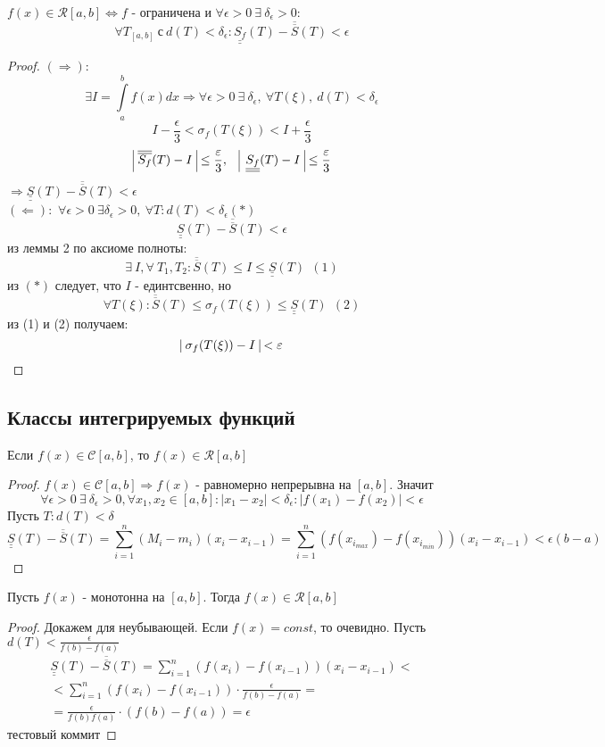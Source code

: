 \begin{theorem}
    $f(x)\in \mathcal{R}[a,b] \Leftrightarrow f$ - ограничена и $\forall \epsilon>0\ \exists\ \delta_{\epsilon}>0:$
    \[\forall T_{[a,b]}\ \text{с}\ d(T)<\delta_{\epsilon}: \underline{\underline{S_f}}(T)-\overline{\overline{S}}(T)<\epsilon\]
\end{theorem} 
\begin{proof}
    $(\Rightarrow):$
    \[\exists I=\int\limits_{a}^{b}f(x)dx \Rightarrow \forall \epsilon>0\ \exists\ \delta_{\epsilon},\ \forall T(\xi),\ d(T)<\delta_{\epsilon}\]
    \[I-\frac{\epsilon}{3}<\sigma_f(T(\xi))<I+\frac{\epsilon}{3}\]
    \[\vline\ \overline{\overline{S_f}}(T)-I\ \vline \leq \frac{\epsilon}{3},\ \ \  \vline\ \underline{\underline{S_f}}(T)-I\ \vline \leq \frac{\epsilon}{3}\]
    $\Rightarrow \underline{\underline{S}}(T)-\overline{\overline{S}}(T)<\epsilon$\\
    $(\Leftarrow):$
    $\forall \epsilon>0\ \exists \delta_{\epsilon}>0,\ \forall T: d(T)<\delta_{\epsilon} (*)$
    \[\underline{\underline{S}}(T)-\overline{\overline{S}}(T)<\epsilon\]
    из леммы 2 по аксиоме полноты: 
    \[\exists\ I, \forall\ T_1, T_2: \overline{\overline{S}}(T)\leq I\leq\underline{\underline{S}}(T)\ \ (1)\]
    из $(*)$ следует, что $I$ - единтсвенно, но 
    \[\forall T(\xi): \overline{\overline{S}}(T)\leq \sigma_f(T(\xi))\leq \underline{\underline{S}}(T)\ \ (2)\]
    из (1) и (2) получаем:
    \[\vline\ \sigma_f(T(\xi))-I \ \vline<\epsilon\]
\end{proof} 
\subsection{Классы интегрируемых функций}
\begin{theorem}
    Если $f(x)\in \mathcal{C}[a,b]$, то $f(x)\in \mathcal{R}[a,b]$
\end{theorem} 
\begin{proof}
    $f(x)\in \mathcal{C}[a,b] \Rightarrow f(x)$ - равномерно непрерывна на $[a,b]$. Значит 
    \[\forall \epsilon>0\ \exists\ \delta_{\epsilon}>0, \forall x_1, x_2\in [a,b]: |x_1-x_2|<\delta_{\epsilon}: |f(x_1)-f(x_2)|<\epsilon\]
    Пусть $T: d(T)<\delta$
    \[\underline{\underline{S}}(T)-\overline{\overline{S}}(T)=\sum\limits_{i=1}^{n}(M_i-m_i)(x_i-x_{i-1})=\sum\limits_{i=1}^{n}(f(x_{i_{max}})-f(x_{i_{min}}))(x_i-x_{i-1})<\epsilon(b-a)\]
\end{proof} 
\begin{theorem}
    Пусть $f(x)$ - монотонна на $[a,b]$. Тогда $f(x)\in \mathcal{R}[a,b]$
\end{theorem} 
\begin{proof}
    Докажем для неубывающей. Если $f(x)=const$, то очевидно.
    Пусть $d(T)<\frac{\epsilon}{f(b)-f(a)}$
    \begin{multline*}
        \underline{\underline{S}}(T)-\overline{\overline{S}}(T)=\sum\limits_{i=1}^{n}(f(x_i)-f(x_{i-1}))(x_i-x_{i-1})<\\
        <\sum\limits_{i=1}^{n}(f(x_i)-f(x_{i-1}))\cdot \frac{\epsilon}{f(b)-f(a)}=\\
        =\frac{\epsilon}{f(b)f(a)}\cdot (f(b)-f(a))=\epsilon
    \end{multline*}
    тестовый коммит
\end{proof} 
